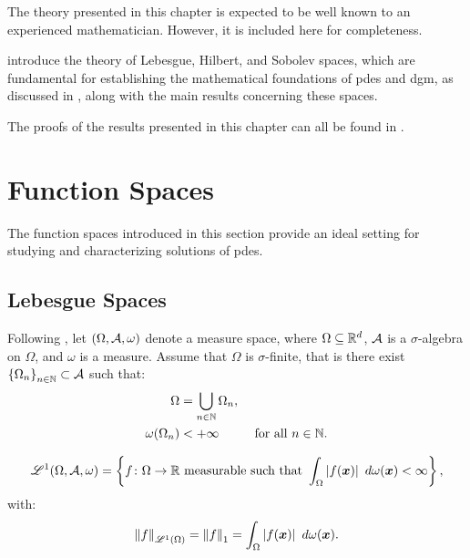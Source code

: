 The theory presented in this chapter is expected to be well known to an experienced mathematician. However, it is included here for completeness.

 introduce the theory of Lebesgue, Hilbert, and Sobolev spaces, which are fundamental for establishing the mathematical foundations of \acrshort{pdes} and \acrshort{dgm}, as discussed in , along with the main results concerning these spaces.

The proofs of the results presented in this chapter can all be found in .

\newpage
\section{Function Spaces}

The function spaces introduced in this section provide an ideal setting for studying and characterizing solutions of \acrshort{pdes}.

\subsection{Lebesgue Spaces} \label{subsection:lebesgue}

Following \cite[p.~89]{Brezis2010}, let $(\Omega, \mathcal{A}, \omega)$ denote a measure space, where $\Omega \subseteq \mathbb{R}^{d}$, $\mathcal{A}$ is a $\sigma$-algebra on $\Omega$, and $\omega$ is a measure. Assume that $\Omega$ is $\sigma$-finite, that is there exist $\left\{ \Omega_n \right\}_{n \in \mathbb{N}} \subset \mathcal{A}$ such that:
\begin{align}
    \Omega & = \bigcup_{n \in \mathbb{N}} \Omega_n, \\
    \omega(\Omega_n) & < +\infty &\text{ for all } n \in \mathbb{N}.
\end{align}

\begin{definition}
    \begin{align}
        \mathscr{L}^{1}(\Omega, \mathcal{A}, \omega) = \left\{ f \colon \Omega \rightarrow \mathbb{R} \text{ measurable such that } \int_{\Omega} \left\lvert f(\bm{x}) \right\rvert ~ d \omega(\bm{x}) < \infty \right\},
    \end{align}
    with:
    \begin{align}
    \left\lVert f \right\rVert_{\mathscr{L}^{1}(\Omega)} = \left\lVert f \right\rVert_{1} = \int_{\Omega} \left\lvert f(\bm{x}) \right\rvert ~ d \omega(\bm{x}).
    \end{align}
\end{definition}

